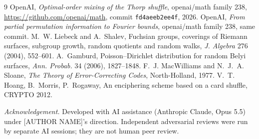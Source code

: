 \documentclass[11pt]{amsart}
\theoremstyle{remark}
\begin{document}
\begin{thebibliography}{9}
 OpenAI, \emph{Optimal-order mixing of the Thorp shuffle}, openai/math family 238,
\url{https://github.com/openai/math}, commit \texttt{fd4aeeb2ee4f}, 2026.
 OpenAI, \emph{From partial permutation information to Fourier bounds}, openai/math family 238, same commit.
 M.~W. Liebeck and A.~Shalev, Fuchsian groups, coverings of Riemann surfaces, subgroup growth,
random quotients and random walks, \emph{J. Algebra} 276 (2004), 552--601.
 A.~Gamburd, Poisson--Dirichlet distribution for random Belyi surfaces, \emph{Ann. Probab.} 34 (2006), 1827--1848.
 F.~J. MacWilliams and N.~J.~A. Sloane, \emph{The Theory of Error-Correcting Codes}, North-Holland, 1977.
 V.~T. Hoang, B.~Morris, P.~Rogaway, An enciphering scheme based on a card shuffle, CRYPTO 2012.
\end{thebibliography}

\medskip\noindent\emph{Acknowledgement.} Developed with AI assistance (Anthropic Claude, Opus 5.5) under
[AUTHOR NAME]'s direction. Independent adversarial reviews were run by separate AI sessions; they are not human
peer review.
\end{document}
